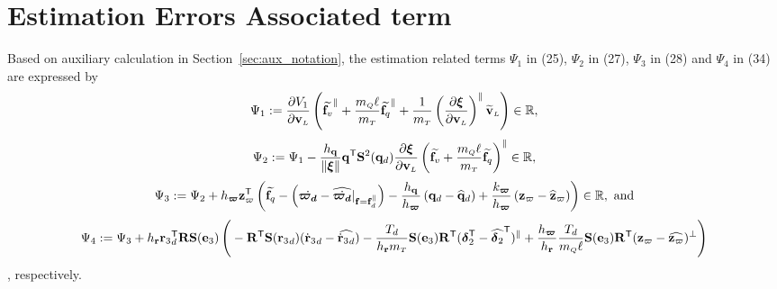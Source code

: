 \documentclass[journal,onecolumn]{IEEEtran}
\begin{document}
\section{Estimation Errors Associated term}

Based on auxiliary calculation in Section~\ref{sec:aux_notation}, the estimation related terms $\Psi_1$ in (25),  $\Psi_2$ in (27), $\Psi_3$ in (28) and $\Psi_4$ in (34) are expressed by
%
\begin{equation}
	\Psi_1:=\frac{\partial V_1}{\partial \vL}\LP\widetilde{\f_v}^{\|} + \frac{\mQ\ellp}{\mT}\widetilde{\f_q}^{\|} + \frac{1}{\mT}\LP\frac{\partial\Xiq}{\partial\vL}\RP^{\|}\vLtilde\RP \in \mathbb{R},
\end{equation}
%
%
\begin{align}
	\Psi_2 := \Psi_1 - \frac{h_\v{q}}{\|\Xiq\|}\dir[T]\Skew[2]{\dird}  \frac{\partial \Xiq}{\partial \vL}\LP\widetilde{\f_v} 
	+ \frac{\mQ\ellp}{\mT}\widetilde{\f_q} \RP^{\|}\in\mathbb{R},
\end{align}
%
\begin{align}
	\Psi_3 := \Psi_2 + h_{\bs\varpi}\zc[T]\LP\widetilde{\f_q} - \LP\dot{\bs{\varpi_d}} - \widehat{\dot{\bs{\varpi_d}}}|_{\f=\f_d^{\|}}\RP -  \frac{h_\v{q}}{h_{\bs{\varpi}}}\LP\dird-\qdhat
	\RP + \frac{k_{\bs{\varpi}}}{h_{\bs{\varpi}}}\LP\zc-\zchat\RP\RP\in\mathbb{R},~\text{and}
\end{align}
%
\begin{align}
	\Psi_4:=\Psi_3 + h_\v{r}\rzd\trs \RotM\Skew{\ez}\LP
	\vphantom{\LP\frac{\partial V_4}{\partial\vL}\dir\RP\trs}
	-\RotM[T]\Skew{\rzd}(\rzddot-\widehat{\rzddot})
	-\frac{T_d}{h_\v{r}\mT}\Skew{\ez}\RotM[T](\bs{\delta}_2\trs-\widehat{\bs{\delta}_2}\trs)^{\|}
	+\frac{h_{\bs\varpi}}{h_\v{r}}\frac{T_d}{\mQ\ellp}\Skew{\ez}\RotM[T](\zc-\widehat{\zc})^{\perp}\RP
\end{align}
%
, respectively.
\end{document}
